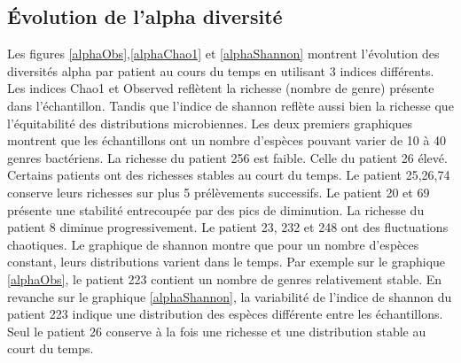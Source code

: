 \documentclass[12pt,a4paper]{article}
\begin{document}
\subsection{Évolution de l'alpha diversité}
Les figures \ref{alphaObs},\ref{alphaChao1} et \ref{alphaShannon} montrent l’évolution des diversités alpha par patient au cours du temps en utilisant 3 indices différents. Les indices Chao1 et Observed reflètent la richesse (nombre de genre) présente dans l’échantillon. Tandis que l’indice de shannon reflète aussi bien la richesse que l’équitabilité des distributions microbiennes.
Les deux premiers graphiques montrent que les échantillons ont un nombre d’espèces pouvant varier de 10 à 40 genres bactériens. La richesse du patient 256 est faible. Celle du patient 26 élevé.
Certains patients ont des richesses stables au court du temps. Le patient 25,26,74 conserve leurs richesses sur plus 5 prélèvements successifs. Le patient 20 et 69 présente une stabilité entrecoupée par des pics de diminution. La richesse du patient 8 diminue progressivement. Le patient 23, 232 et 248 ont des fluctuations chaotiques.
Le graphique de shannon montre que pour un nombre d’espèces constant, leurs distributions varient dans le temps. Par exemple sur le graphique \ref{alphaObs}, le patient 223 contient un nombre de genres relativement stable. En revanche sur le graphique \ref{alphaShannon}, la variabilité de l’indice de shannon du patient 223 indique une distribution des espèces différente entre les échantillons. Seul le patient 26 conserve à la fois une richesse et une distribution stable au court du temps.
\end{document}
